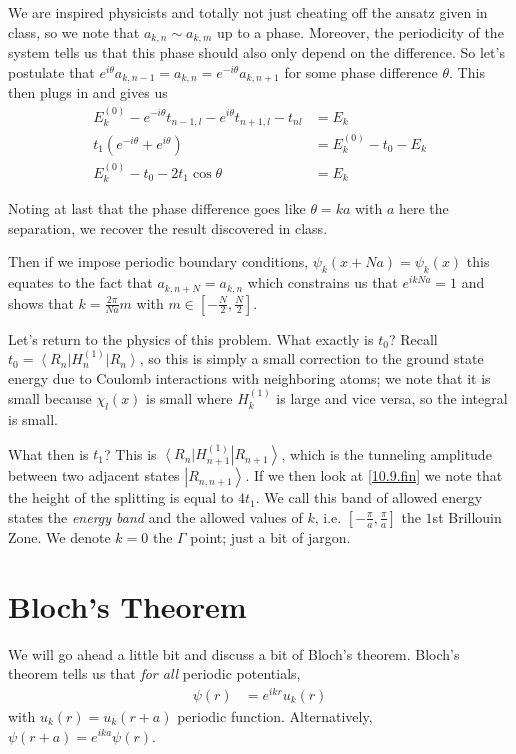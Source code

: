 \documentclass[10pt]{report}
\newcommand{\bra}[1]{\left<#1\right|}
\newcommand{\ket}[1]{\left|#1\right>}
\begin{document}
We are inspired physicists and totally not just cheating off the ansatz given in class, so we note that $a_{k,n} \sim a_{k,m}$ up to a phase. Moreover, the periodicity of the system tells us that this phase should also only depend on the difference. So let's postulate that $e^{i\theta}a_{k,n - 1} = a_{k,n} = e^{-i\theta}a_{k,n+1}$ for some phase difference $\theta$. This then plugs in and gives us
\begin{align}
    E^{(0)}_k - e^{-i\theta}t_{n-1,l} - e^{i\theta}t_{n+1,l} - t_{nl} &= E_k\\
    t_1\left( e^{-i\theta} + e^{i\theta} \right) &= E_k^{(0)} - t_0 - E_k\\
    E_{k}^{(0)} - t_0 - 2t_1\cos\theta &= E_k\label{10.9.fin}
\end{align}

Noting at last that the phase difference goes like $\theta = ka$ with  $a$ here the separation, we recover the result discovered in class.

Then if we impose periodic boundary conditions, $\psi_k(x + Na) = \psi_k(x)$ this equates to the fact that $a_{k,n+N} = a_{k,n}$ which constrains us that $e^{ikNa} = 1$ and shows that $k = \frac{2\pi}{Na}m$ with $m \in \left[ -\frac{N}{2}, \frac{N}{2} \right]$. 

Let's return to the physics of this problem. What exactly is $t_0$? Recall $t_0 = \bra{R_n}H_n^{(1)}\ket{R_n}$, so this is simply a small correction to the ground state energy due to Coulomb interactions with neighboring atoms; we note that it is small because $\chi_l(x)$ is small where $H_k^{(1)}$ is large and vice versa, so the integral is small.

What then is $t_1$? This is $\bra{R_n}H_{n+1}^{(1)}\ket{R_{n+1}}$, which is the tunneling amplitude between two adjacent states $\ket{R_{n,n+1}}$. If we then look at \eqref{10.9.fin} we note that the height of the splitting is equal to $4t_1$. We call this band of allowed energy states the \emph{energy band} and the allowed values of $k$, i.e. $\left[ -\frac{\pi}{a}, \frac{\pi}{a} \right]$ the $1$st Brillouin Zone. We denote $k = 0$ the $\Gamma$ point; just a bit of jargon. 

\section{Bloch's Theorem}

We will go ahead a little bit and discuss a bit of Bloch's theorem. Bloch's theorem tells us that \emph{for all} periodic potentials,
\begin{align}
    \psi(r) &= e^{ikr}u_k(r)
\end{align}
with $u_k(r) = u_k(r+a)$ periodic function. Alternatively, $\psi(r+a) = e^{ika}\psi(r)$.
\end{document}
